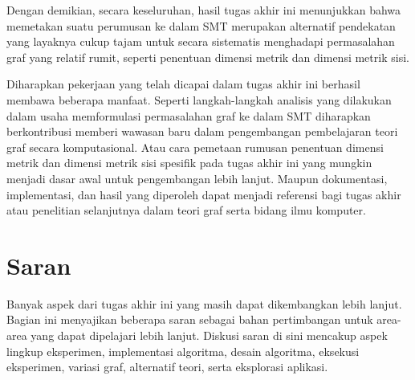 Dengan demikian, secara keseluruhan, hasil tugas akhir ini menunjukkan bahwa memetakan suatu perumusan ke dalam SMT merupakan alternatif pendekatan yang layaknya cukup tajam untuk secara sistematis menghadapi permasalahan graf yang relatif rumit, seperti penentuan dimensi metrik dan dimensi metrik sisi.

Diharapkan pekerjaan yang telah dicapai dalam tugas akhir ini berhasil membawa beberapa manfaat. Seperti langkah-langkah analisis yang dilakukan dalam usaha memformulasi permasalahan graf ke dalam SMT diharapkan berkontribusi memberi wawasan baru dalam pengembangan pembelajaran teori graf secara komputasional. Atau cara pemetaan rumusan penentuan dimensi metrik dan dimensi metrik sisi spesifik pada tugas akhir ini yang mungkin menjadi dasar awal untuk pengembangan lebih lanjut. Maupun dokumentasi, implementasi, dan hasil yang diperoleh dapat menjadi referensi bagi tugas akhir atau penelitian selanjutnya dalam teori graf serta bidang ilmu komputer.

\section{Saran}

Banyak aspek dari tugas akhir ini yang masih dapat dikembangkan lebih lanjut. Bagian ini menyajikan beberapa saran sebagai bahan pertimbangan untuk area-area yang dapat dipelajari lebih lanjut. Diskusi saran di sini mencakup aspek lingkup eksperimen, implementasi algoritma, desain algoritma, eksekusi eksperimen, variasi graf, alternatif teori, serta eksplorasi aplikasi.

